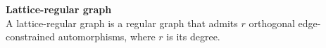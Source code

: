 \begin{definition}\textbf{Lattice-regular graph}\\
A lattice-regular graph is a regular graph that admits $r$ orthogonal edge-constrained automorphisms, where $r$ is its degree.
\end{definition}





